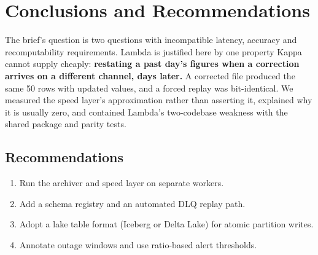 \chapter{Conclusions and Recommendations}
\label{ch:conclusion}

The brief's question is two questions with incompatible latency, accuracy
and recomputability requirements. Lambda is justified here by one
property Kappa cannot supply cheaply: \textbf{restating a past day's
figures when a correction arrives on a different channel, days later.}
A corrected file produced the same 50 rows with updated values, and a
forced replay was bit-identical. We measured the
speed layer's approximation rather than asserting it, explained why it
is usually zero, and contained Lambda's two-codebase weakness with the
shared  package and parity tests.

\section*{Recommendations}

\begin{enumerate}
  \item Run the archiver and speed layer on separate workers.
  \item Add a schema registry and an automated DLQ replay path.
  \item Adopt a lake table format (Iceberg or Delta Lake) for atomic
        partition writes.
  \item Annotate outage windows and use ratio-based alert thresholds.
\end{enumerate}
